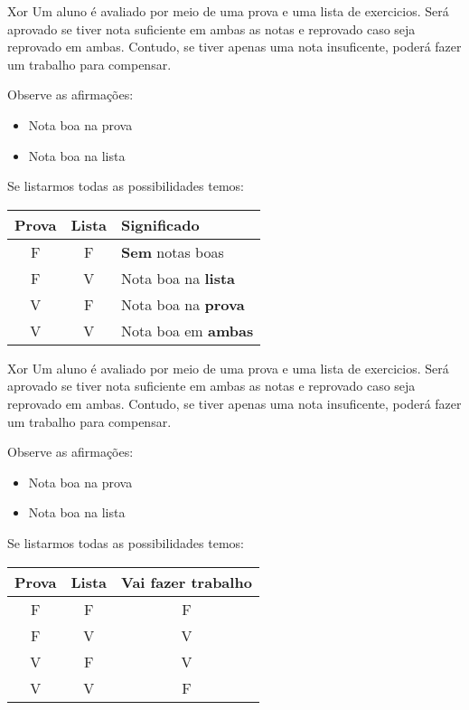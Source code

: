 \begin{frame}{Xor} 
	Um aluno é avaliado por meio de uma prova e uma lista de exercicios. Será aprovado se tiver nota suficiente em ambas as notas e reprovado caso seja reprovado em ambas. Contudo, se tiver apenas uma nota insuficente, poderá fazer um trabalho para compensar.

	Observe as afirmações:

	\vspace{0.2cm}
	\begin{itemize}
		\item Nota boa na prova
		\item Nota boa na lista
	\end{itemize}

	Se listarmos todas as possibilidades temos:

		\center 
		\vspace{0.4cm}

		\begin{tabular}{|c|c|l|} \hline 
			\textbf{Prova} & \textbf{Lista} & \textbf{ Significado } \\ \hline 
			F & F & \textbf{Sem} notas boas \\ \hline 
			F & V & Nota boa na \textbf{lista} \\ \hline 
			V & F & Nota boa na \textbf{prova} \\ \hline
			V & V & Nota boa em \textbf{ambas} \\ \hline 
		\end{tabular} 

\end{frame}


\begin{frame}{Xor} 
	Um aluno é avaliado por meio de uma prova e uma lista de exercicios. Será aprovado se tiver nota suficiente em ambas as notas e reprovado caso seja reprovado em ambas. Contudo, se tiver apenas uma nota insuficente, poderá fazer um trabalho para compensar.

	Observe as afirmações:

	\vspace{0.2cm}
	\begin{itemize}
		\item Nota boa na prova
		\item Nota boa na lista
	\end{itemize}

	Se listarmos todas as possibilidades temos:

		\center 
		\vspace{0.4cm}

		\begin{tabular}{|c|c|c|} \hline 
			\textbf{Prova} & \textbf{Lista} & \textbf{ Vai fazer trabalho } \\ \hline 
			F & F & F \\ \hline 
			F & V & V \\ \hline 
			V & F & V \\ \hline
			V & V & F \\ \hline 
		\end{tabular} 

\end{frame}




